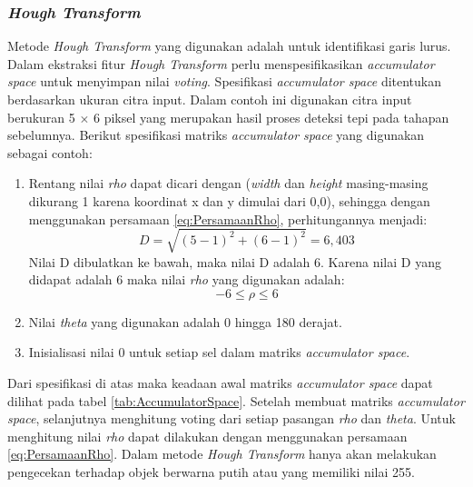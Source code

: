 \subsubsection{\textit{Hough Transform}}
\noindent Metode \textit{Hough Transform} yang digunakan adalah untuk identifikasi garis lurus. Dalam ekstraksi fitur \textit{Hough Transform} perlu menspesifikasikan \textit{accumulator space} untuk menyimpan nilai \textit{voting}. Spesifikasi \textit{accumulator space} ditentukan berdasarkan ukuran citra input. Dalam contoh ini digunakan citra input berukuran 5 $\times$ 6 piksel yang merupakan hasil proses deteksi tepi pada tahapan sebelumnya. Berikut spesifikasi matriks \textit{accumulator space} yang digunakan sebagai contoh:
\begin{enumerate}
\item Rentang nilai \textit{rho} dapat dicari dengan (\textit{width} dan \textit{height} masing-masing dikurang 1 karena koordinat x dan y dimulai dari 0,0), sehingga dengan menggunakan persamaan \ref{eq:PersamaanRho}, perhitungannya menjadi:
\begin{equation*}
	D = \sqrt{(5-1)^2 + (6-1)^2} = 6,403
\end{equation*}
Nilai D dibulatkan ke bawah, maka nilai D adalah 6. Karena nilai D yang didapat adalah 6 maka nilai \textit{rho} yang digunakan adalah:
\begin{equation*}
	-6 \leq \rho \leq 6
\end{equation*}
\item Nilai \textit{theta} yang digunakan adalah 0 hingga 180 derajat.
\item Inisialisasi nilai 0 untuk setiap sel dalam matriks \textit{accumulator space}.
\end{enumerate}
\noindent Dari spesifikasi di atas maka keadaan awal matriks \textit{accumulator space} dapat dilihat pada tabel \ref{tab:AccumulatorSpace}. Setelah membuat matriks \textit{accumulator space}, selanjutnya menghitung voting dari setiap pasangan \textit{rho} dan \textit{theta}. Untuk menghitung nilai \textit{rho} dapat dilakukan dengan menggunakan persamaan \ref{eq:PersamaanRho}. Dalam metode \textit{Hough Transform} hanya akan melakukan pengecekan terhadap objek berwarna putih atau yang memiliki nilai 255.

